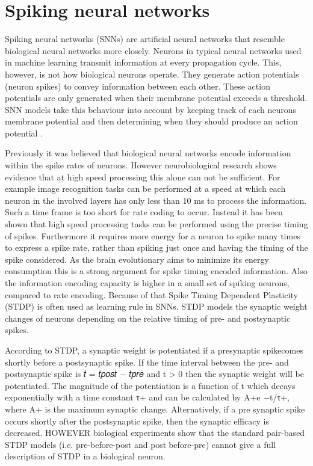 \section{Spiking neural networks}

Spiking neural networks (SNNs) are artificial neural networks that resemble biological neural networks more closely. Neurons in typical neural networks used in machine learning transmit information at every propagation cycle. This, however, is not how biological neurons operate. They generate action potentials (neuron spikes) to convey information between each other. These action potentials are only generated when their membrane potential exceeds a threshold. SNN models take this behaviour into account by keeping track of each neurons membrane potential and then determining when they should produce an action potential  \citep{SpikingNeuronModelsBook}.

Previously it was believed that biological neural networks encode information within the spike rates of neurons. However neurobiological research shows evidence that at high speed processing this alone can not be sufficient. For example image recognition tasks can be performed at a speed at which each neuron in the involved layers has only less than 10 ms to process the information. Such a time frame is too short for rate coding to occur. Instead it has been shown that high speed processing tasks can be performed using the precise timing of spikes. Furthermore it requires more energy for a neuron to spike many times to express a spike rate, rather than spiking just once and having the timing of the spike considered. As the brain evolutionary aims to minimize its energy consumption this is a strong argument for spike timing encoded information. Also the information encoding capacity is higher in a small set of spiking neurons, compared to rate encoding. \citep{LearningInBiologicallyPlausibleSNN}
Because of that Spike Timing Dependent Plasticity (STDP) is often used as learning rule in SNNs. STDP models the synaptic weight changes of neurons depending on the relative timing of pre- and postsynaptic spikes.

 According to STDP, a synaptic weight is potentiated if a presynaptic spikecomes shortly before a postsynaptic spike. If the time interval between the pre- and postsynaptic spike 
is 𝑡 = 𝑡𝑝𝑜𝑠𝑡 − 𝑡𝑝𝑟𝑒 and t > 0 then the synaptic weight will be potentiated. The magnitude of the 
potentiation is a function of t which decays exponentially with a time constant τ+ and can be calculated 
by A+e
−t/τ+, where A+ is the maximum synaptic change. Alternatively, if a pre synaptic spike occurs 
shortly after the postsynaptic spike, then the synaptic efficacy is decreased.
HOWEVER biological experiments show that the standard pair-based STDP models (i.e. pre-before-post and postbefore-pre) cannot give a full description of STDP in a biological neuron. 
\citep{LearningInBiologicallyPlausibleSNN}	

